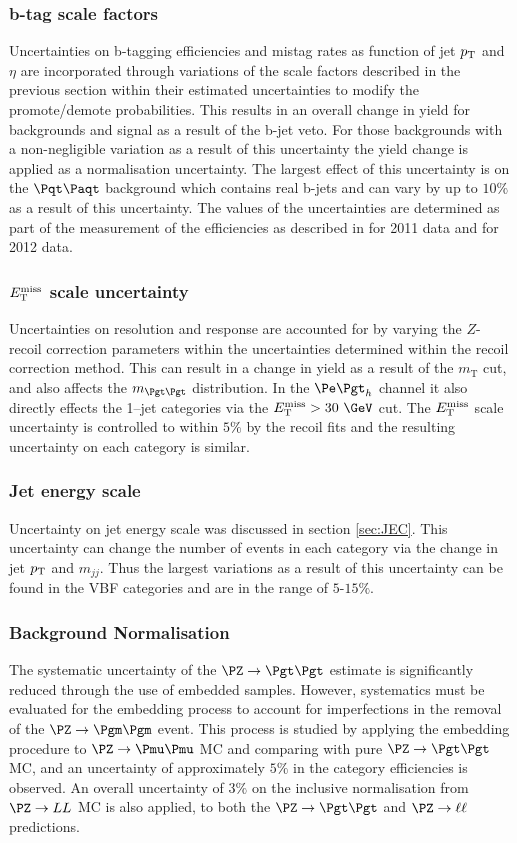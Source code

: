\subsubsection{\textbf{b-tag scale factors}} 
Uncertainties on b-tagging efficiencies and mistag rates as function of jet
$p_{\mathrm{T}}$ and $\eta$ are incorporated through variations of the scale factors
described in the previous section within their estimated uncertainties to modify
the promote/demote probabilities. This results in an overall change in yield for
backgrounds and signal as a result of the b-jet veto. For those backgrounds
with a non-negligible variation as a result of this uncertainty the yield change
is applied as a normalisation uncertainty. The largest effect of this
uncertainty is on the $\ttbar$ background which contains real b-jets and can
vary by up to $10\%$ as a result of this uncertainty. The values of the uncertainties 
are determined as part of the measurement of the efficiencies as described in 
\cite{CMS-PAS-BTV-11-004} for 2011 data and \cite{CMS-PAS-BTV-13-001} for 2012 data.

\subsubsection{\textbf{$E_{\mathrm{T}}^{\text{miss}}$ scale uncertainty}}
Uncertainties on \MET resolution and response are accounted for
by varying the $Z$-recoil correction parameters within the uncertainties
determined within the recoil correction method.
This can result in a change in yield as a result of the $m_{\text{T}}$ cut, and
also affects the $m_{\Pgt\Pgt}$ distribution. In the $\etau$ channel it also directly
effects the 1--jet categories via the $\MET > 30~\GeV$ cut. The $E_{\mathrm{T}}^{\text{miss}}$ scale
uncertainty is controlled to within $5\%$ \cite{CMS-PAS-JME-12-002} by the recoil fits and the resulting
uncertainty on each category is similar. 

\subsubsection{\textbf{Jet energy scale}}
Uncertainty on jet energy scale was discussed in section
\ref{sec:JEC}. This uncertainty can change the number of events in
each category via the change in jet $p_{\mathrm{T}}$ and $m_{jj}$. Thus the largest
variations as a result of this uncertainty can be found in the VBF categories
and are in the range of $5$-$15\%$. 

\subsubsection{\textbf{Background Normalisation}}
The systematic uncertainty of the $\ZToTauTau$ estimate is significantly reduced
through the use of embedded samples. However, systematics must be evaluated for
the embedding process to account for imperfections in the removal of the
$\PZ\to\Pgm\Pgm$ event. This process is studied by applying the embedding
procedure to $\PZ\to\Pmu\Pmu$ \ac{MC} and comparing with pure $\ZToTauTau$
\ac{MC}, and an uncertainty of approximately $5\%$ in the category efficiencies
is observed. An overall uncertainty of $3\%$ on the inclusive normalisation from
$\PZ\to LL$ \ac{MC} is also applied, to both the $\ZToTauTau$ and
$\PZ\to\ell\ell$ predictions.


